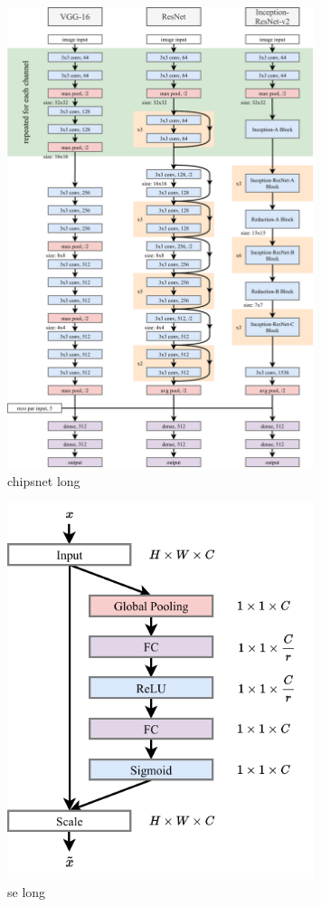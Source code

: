 \begin{figure} %
    \includegraphics[width=0.8\textwidth]{diagrams/7-cvn/chipsnet.pdf}
    \caption[chipsnet short]
    {chipsnet long}
    \label{fig:chipsnet}
\end{figure}

\begin{figure} %
    \includegraphics[width=0.8\textwidth]{diagrams/7-cvn/se.pdf}
    \caption[se short]
    {se long}
    \label{fig:se}
\end{figure}

